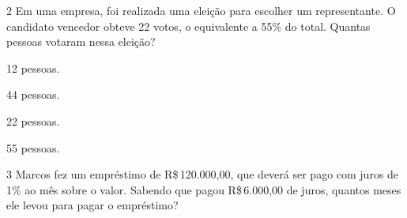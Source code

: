 




\num{2} Em uma empresa, foi realizada uma eleição para escolher um
representante. O candidato vencedor obteve 22 votos, o equivalente a
55\% do total. Quantas pessoas votaram nessa eleição?

\begin{escolha}[itemsep=0pt]
\item 12 pessoas.
\item 44 pessoas.
\item 22 pessoas.
\item 55 pessoas.
\end{escolha}











\num{3} Marcos fez um empréstimo de R\$\,120.000,00, que deverá ser pago com
juros de 1\% ao mês sobre o valor. Sabendo que pagou R\$\,6.000,00 de
juros, quantos meses ele levou para pagar o empréstimo?

